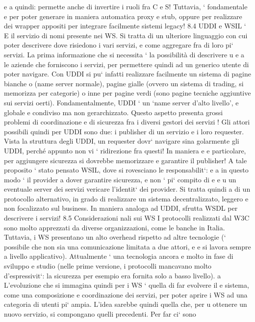 \documentclass[a4paper,12pt]{article}
\begin{document}
e
a
quindi: permette anche di invertire i ruoli fra C e S! Tuttavia, ` fondamentale
e
per poter generare in maniera automatica proxy e stub, oppure per realizzare
dei wrapper appositi per integrare facilmente sistemi legacy!
8.4
UDDI e WSIL
`
E il servizio di nomi presente nei WS. Si tratta di un ulteriore linguaggio con
cui poter descrivere dove risiedono i vari servizi, e come aggregare fra di loro
pi` servizi. La prima informazione che si necessita ` la possibilità di descrivere
u
e
a
le aziende che forniscono i servizi, per permettere quindi ad un generico utente
di poter navigare.
Con UDDI si pu` infatti realizzare facilmente un sistema di pagine bianche
o
(name server normale), pagine gialle (ovvero un sistema di trading, si memorizza per categorie) o inne per pagine verdi
(sono pagine tecniche aggiuntive
sui servizi oerti). Fondamentalmente, UDDI ` un {`}name server d'alto livello',
e
globale e condiviso ma non gerarchizzato. Questo aspetto presenta grossi problemi di coordinazione e di sicurezza fra i
diversi gestori dei servizi !
Gli attori possibili quindi per UDDI sono due: i publisher di un servizio e i
loro requester. Vista la struttura degli UDDI, un requester dovr` navigare sina
golarmente gli UDDI, perché appunto non vi ` ridirezione fra questi! In maniera
e
e
particolare, per aggiungere sicurezza si dovrebbe memorizzare e garantire il publisher!
A tale proposito ` stato pensato WSIL, dove si rovesciano le responsabilit`:
e
a
in questo modo ` il provider a dover garantire sicurezza, e non ` pi` compito di
e
e u
un eventuale server dei servizi vericare l'identit` dei provider. Si tratta quindi
a
di un protocollo alternativo, in grado di realizzare un sistema decentralizzato,
leggero e non focalizzato sul business. In maniera analoga ad UDDI, sfrutta
WSDL per descrivere i servizi!
8.5
Considerazioni nali sui WS
I protocolli realizzati dal W3C sono molto apprezzati da diverse organizzazioni,
come le banche in Italia. Tuttavia, i WS presentano un alto overhead rispetto ad
altre tecnologie (` possibile che non sia una comunicazione limitata a due attori,
e
e si lavora sempre a livello applicativo). Attualmente ` una tecnologia ancora
e
molto in fase di sviluppo e studio (nelle prime versione, i protocolli mancavano
molto d'espressivit`: la sicurezza per esempio era fornita solo a basso livello).
a
L'evoluzione che si immagina quindi per i WS ` quella di far evolvere il
e
sistema, come una composizione e coordinazione dei servizi, per poter aprire i
WS ad una categoria di utenti pi` ampia. L'idea sarebbe quindi quella che, per
u
ottenere un nuovo servizio, si compongano quelli precedenti. Per far ci` sono
\end{document}
